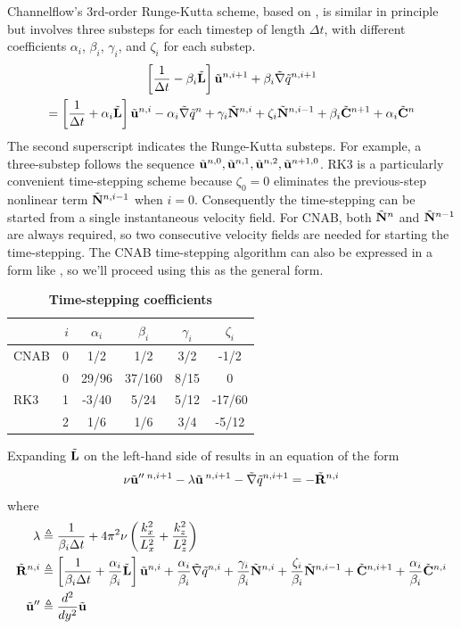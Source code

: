 \documentclass{article}[12pt]
\begin{document}
Channelflow's 3rd-order Runge-Kutta scheme, based on \cite{Spalart91},
is similar in principle but involves three substeps for each timestep
of length $\Delta t$, with different coefficients $\alpha_i$, $\beta_i$,
$\gamma_i$, and $\zeta_i$ for each substep.
\begin{multline}\label{RK3}
\left[\frac{1}{\Delta t} - \beta_i\tilde{{\bf L}}\right] \tilde{{\bf u}}^{n,i+1} + \beta_i \tilde{\bf \nabla} \tilde{q}^{n,i+1} \\
=  \left[\frac{1}{\Delta t} + \alpha_i \tilde{{\bf L}}\right] \tilde{{\bf u}}^{n,i} - \alpha_i \tilde{\bf \nabla} \tilde{q}^{n}
+ \gamma_i \tilde{{\bf N}}^{n,i} + \zeta_i \tilde{{\bf N}}^{n,i-1}
+ \beta_i  \tilde{{\bf C}}^{n+1} + \alpha_i \tilde{{\bf C}}^{n}
\end{multline}
The second superscript indicates the Runge-Kutta substeps. For example,
a three-substep follows the sequence $\tilde{{\bf u}}^{n,0}, \tilde{{\bf u}}^{n,1},  \tilde{{\bf u}}^{n,2},
\tilde{{\bf u}}^{n+1,0}$. RK3 is a particularly convenient time-stepping scheme because
$\zeta_0=0$ eliminates the previous-step nonlinear term
$\tilde{{\bf N}}^{n,i-1}$ when $i=0$. Consequently the time-stepping can be
started from a single instantaneous velocity field. For CNAB, both
$\tilde{{\bf N}}^{n}$ and $\tilde{{\bf N}}^{n-1}$ are always required, so two consecutive
velocity fields are needed for starting the time-stepping. The CNAB
time-stepping algorithm can also be expressed in a form like ,
so we'll proceed using this as the general form.

\begin{table}
\centering
\caption{{\bf Time-stepping coefficients}}
\label{rk3coeffs}
\begin{tabular}{l|rcccc}
    & $i$ &	$\alpha_i$ &	$\beta_i$ & $\gamma_i$ & $\zeta_i$ \\\hline
CNAB &0& 1/2 & 1/2 & 3/2 & -1/2 \\\hline
    & 0   & 29/96 & 37/160 & 8/15 & 0 \\
RK3 &1   & -3/40 & 5/24   & 5/12 & -17/60 \\
    &2   & 1/6   & 1/6    & 3/4  & -5/12
\end{tabular}
\end{table}

Expanding $\tilde{{\bf L}}$ on the left-hand side of  results in an equation
of the form
\begin{align}
\nu \tilde{{\bf u}}''^{\; n,i+1} - \lambda \tilde{{\bf u}}^{\: n,i+1} - \tilde{\bf \nabla} \tilde{q}^{n,i+1} = -\tilde{{\bf R}}^{n,i} \label{tau_eqn}
\end{align}
where
\begin{align}
\lambda &\triangleq \frac{1}{\beta_i \Delta t} + 4 \pi^2 \nu \left(\frac{k_x^2}{L_x^2} + \frac{k_z^2}{L_z^2}\right) \label{lambda_defn} \\
\tilde{{\bf R}}^{n,i} &\triangleq \left[ \frac{1}{\beta_i \Delta t} + \frac{\alpha_i}{\beta_i} \tilde{{\bf L}}\right] \tilde{{\bf u}}^{n,i} + \frac{\alpha_i}{\beta_i} \tilde{\bf \nabla} \tilde{q}^{n,i} + \frac{\gamma_i}{\beta_i} \tilde{{\bf N}}^{n,i} + \frac{\zeta_i}{\beta_i} \tilde{{\bf N}}^{n,i-1} + \tilde{{\bf C}}^{n,i+1} + \frac{\alpha_i}{\beta_i} \tilde{{\bf C}}^{n,i} \label{Rdefn} \\
\tilde{{\bf u}}'' &\triangleq \frac{d^2}{dy^2} \tilde{{\bf u}}
\end{align}
\end{document}
